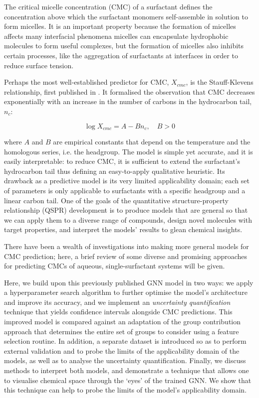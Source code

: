 The critical micelle concentration (CMC) of a surfactant defines the concentration above which the surfactant monomers self-assemble in solution to form micelles. It is an important property because the formation of micelles affects many interfacial phenomena \cite{rosenSurfactantsInterfacialPhenomena2012} micelles can encapsulate hydrophobic molecules to form useful complexes, but the formation of micelles also inhibits certain processes, like the aggregation of surfactants at interfaces in order to reduce surface tension.

Perhaps the most well-established predictor for CMC, $X_{cmc}$, is the Stauff-Klevens relationship, first published in \citeyear{klevensStructureAggregationDilate1953} \cite{klevensStructureAggregationDilate1953}. It formalised the observation that CMC decreases exponentially with an increase in the number of carbons in the hydrocarbon tail, $n_c$:

\begin{equation}
    \label{eq:klevens}
    \log X_{cmc} = A - Bn_c, \quad B > 0
\end{equation}

where $A$ and $B$ are empirical constants that depend on the temperature and the homologous series, i.e. the headgroup. The model is simple yet accurate, and it is easily interpretable: to reduce CMC, it is sufficient to extend the surfactant's hydrocarbon tail thus defining an easy-to-apply qualitative heuristic. Its drawback as a predictive model is its very limited applicability domain; each set of parameters is only applicable to surfactants with a specific headgroup and a linear carbon tail.
One of the goals of the quantitative structure-property relationship (QSPR) development is to produce models that are general so that we can apply them to a diverse range of compounds, design novel molecules with target properties, and
interpret the models' results to glean chemical insights.

There have been a wealth of investigations into making more general models for
CMC prediction; here, a brief review of some diverse and promising approaches
for predicting CMCs of aqueous, single-surfactant systems will be given.



Here, we build upon this previously published GNN model in two ways: we apply a
hyperparameter search algorithm to further optimise the model's architecture and
improve its accuracy, and we implement an \emph{uncertainty quantification}
technique that yields confidence intervals alongside CMC predictions. This
improved model is compared against an adaptation of the group contribution
approach that determines the entire set of groups to consider using a feature
selection routine. In addition, a separate dataset is introduced so as to
perform external validation and to probe the limits of the applicability domain
of the models, as well as to analyse the uncertainty quantification. Finally, we
discuss methods to interpret both models, and demonstrate a technique that
allows one to visualise chemical space through the `eyes' of the trained GNN. We
show that this technique can help to probe the limits of the model's
applicability domain.